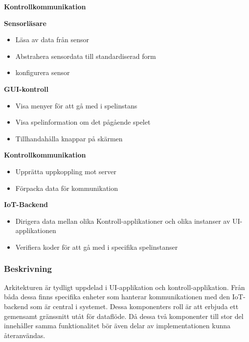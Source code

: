 \begin{labeling}{\small{\textbf{Kontrollkommunikation}}}
    \item [\small{\textbf{Sensorläsare}}]
        \begin{itemize}
            \item Läsa av data från sensor
            \item Abstrahera sensordata till standardiserad form
            \item konfigurera sensor
            \newline
        \end{itemize}

    \item [\small{\textbf{GUI-kontroll}}]
        \begin{itemize}
            \item Visa menyer för att gå med i spelinstans
            \item Visa spelinformation om det pågående spelet
            \item Tillhandahålla knappar på skärmen
            \newline
        \end{itemize}

    \item [\small{\textbf{Kontrollkommunikation}}]
        \begin{itemize}
            \item Upprätta uppkoppling mot server
            \item Förpacka data för kommunikation
            \newline
        \end{itemize}

    \item [\small{\textbf{IoT-Backend}}]
        \begin{itemize}
            \item Dirigera data mellan olika Kontroll-applikationer och olika instanser av UI-applikationen
            \item Verifiera koder för att gå med i specifika spelinstanser
            \newline
        \end{itemize}
\end{labeling}

\subsubsection{Beskrivning}
Arkitekturen är tydligt uppdelad i UI-applikation och kontroll-applikation. Från båda dessa finns specifika enheter som hanterar kommunikationen med den IoT-backend som är central i systemet. Dessa komponenters roll är att erbjuda ett gemensamt gränssnitt utåt för dataflöde. Då dessa två komponenter till stor del innehåller samma funktionalitet bör även delar av implementationen kunna återanvändas.\\

